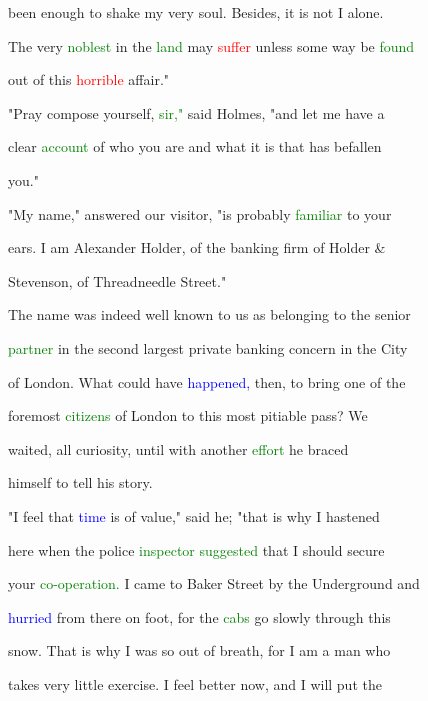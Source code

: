  been enough to shake my very soul. Besides, it is not I alone.

 The very \textcolor{green}{noblest} in the \textcolor{green}{land} may \textcolor{red}{suffer} unless some way be \textcolor{green}{found}

 out of this \textcolor{red}{horrible} affair."



 \textcolor{BurntOrange}{"Pray} compose yourself, \textcolor{green}{sir,"} said Holmes, "and let me have a

 clear \textcolor{green}{account} of who you are and what it is that has befallen

 you."



 "My name," answered our \textcolor{BurntOrange}{visitor,} "is probably \textcolor{green}{familiar} to your

 ears. I am Alexander Holder, of the banking firm of Holder &

 Stevenson, of Threadneedle Street."



 The name was indeed well known to us as belonging to the senior

 \textcolor{green}{partner} in the second largest private banking concern in the City

 of London. What could have \textcolor{blue}{happened,} then, to bring one of the

 foremost \textcolor{green}{citizens} of London to this most pitiable pass? We

 \textcolor{BurntOrange}{waited,} all \textcolor{BurntOrange}{curiosity,} until with another \textcolor{green}{effort} he braced

 himself to tell his story.



 "I feel that \textcolor{blue}{time} is of value," said he; "that is why I hastened

 here when the \textcolor{BurntOrange}{police} \textcolor{green}{inspector} \textcolor{green}{suggested} that I should secure

 your \textcolor{green}{co-operation.} I came to Baker Street by the Underground and

 \textcolor{blue}{hurried} from there on foot, for the \textcolor{green}{cabs} go slowly through this

 snow. That is why I was so out of breath, for I am a man who

 takes very little exercise. I feel better now, and I will put the

